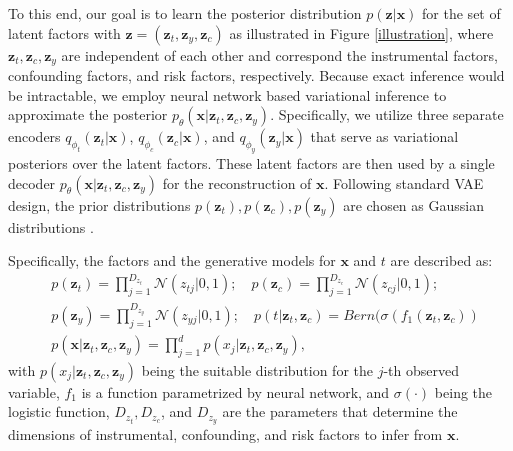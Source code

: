 \documentclass[letterpaper]{article} %
\begin{document}
To this end, our goal is to learn the posterior distribution $p(\mathbf{z}|\mathbf{x})$ for the set of latent factors  with $\mathbf{z}= (\mathbf{z}_t, \mathbf{z}_y, \mathbf{z}_c)$ as illustrated in Figure \ref{illustration}, where $\mathbf{z}_t,\mathbf{z}_c, \mathbf{z}_y$ are independent of each other and correspond the instrumental factors, confounding factors, and risk factors, respectively.
Because exact inference would be intractable, we employ neural network based variational inference to approximate the posterior $p_\theta(\mathbf{x}|\mathbf{z}_t, \mathbf{z}_c, \mathbf{z}_y)$. Specifically, we utilize three separate encoders $q_{\phi_t}(\mathbf{z}_t|\mathbf{x})$, $q_{\phi_c}(\mathbf{z}_c|\mathbf{x})$, and $q_{\phi_y}(\mathbf{z}_y|\mathbf{x})$ that serve as variational posteriors over the latent factors.
These latent factors are then used by a single decoder $p_\theta(\mathbf{x}|\mathbf{z}_t,\mathbf{z}_c, \mathbf{z}_y)$ for the reconstruction of $\mathbf{x}$. Following standard VAE design, the prior distributions $p(\mathbf{z}_t),p(\mathbf{z}_c),p(\mathbf{z}_y)$ are chosen as Gaussian distributions \cite{Kingma2014}.

Specifically, the factors and the generative models for $\mathbf{x}$ and $t$ are described as:
\begin{align}
&p(\mathbf{z}_t) = \prod\limits_{j=1}^{D_{z_t}} \mathcal{N}(z_{tj}|0,1);\quad
p(\mathbf{z}_c) = \prod\limits_{j=1}^{D_{z_c}} \mathcal{N}(z_{cj}|0,1); \nonumber\\
&p(\mathbf{z}_y) = \prod\limits_{j=1}^{D_{z_y}} \mathcal{N}(z_{yj}|0,1);\quad p(t|\mathbf{z}_t,\mathbf{z}_c) = Bern(\sigma(f_1(\mathbf{z}_t,\mathbf{z}_c))\nonumber\\
& p(\mathbf{x}|\mathbf{z}_t,\mathbf{z}_c, \mathbf{z}_y) = \prod\limits_{j=1}^{d} p(x_j|\mathbf{z}_t,\mathbf{z}_c, \mathbf{z}_y),
\end{align}
with $p(x_j|\mathbf{z}_t,\mathbf{z}_c, \mathbf{z}_y)$ being the suitable distribution for the $j$-th observed variable, $f_1$ is a function parametrized by neural network, and $\sigma(\cdot)$ being the logistic function, $D_{z_t},D_{z_c}$, and $D_{z_y}$ are the parameters that determine the dimensions of instrumental, confounding, and risk factors to infer from $\mathbf{x}$.
\end{document}
